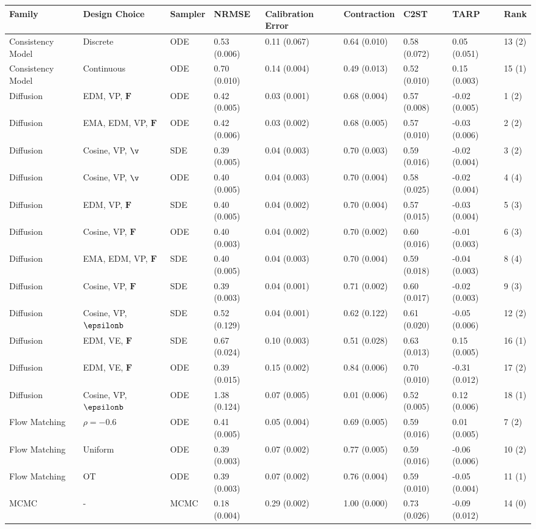 \begin{tabular}{lllllllll}
\toprule
Family & Design Choice & Sampler & NRMSE & Calibration Error & Contraction & C2ST & TARP & Rank \\
\midrule
Consistency Model & Discrete & ODE & 0.53 (0.006) & 0.11 (0.067) & 0.64 (0.010) & 0.58 (0.072) & 0.05 (0.051) & 13 (2) \\
Consistency Model & Continuous & ODE & 0.70 (0.010) & 0.14 (0.004) & 0.49 (0.013) & 0.52 (0.010) & 0.15 (0.003) & 15 (1) \\
Diffusion & EDM, VP, $\mathbf{F}$ & ODE & 0.42 (0.005) & 0.03 (0.001) & 0.68 (0.004) & 0.57 (0.008) & -0.02 (0.005) & 1 (2) \\
Diffusion & EMA, EDM, VP, $\mathbf{F}$ & ODE & 0.42 (0.006) & 0.03 (0.002) & 0.68 (0.005) & 0.57 (0.010) & -0.03 (0.006) & 2 (2) \\
Diffusion & Cosine, VP, $\v$ & SDE & 0.39 (0.005) & 0.04 (0.003) & 0.70 (0.003) & 0.59 (0.016) & -0.02 (0.004) & 3 (2) \\
Diffusion & Cosine, VP, $\v$ & ODE & 0.40 (0.005) & 0.04 (0.003) & 0.70 (0.004) & 0.58 (0.025) & -0.02 (0.004) & 4 (4) \\
Diffusion & EDM, VP, $\mathbf{F}$ & SDE & 0.40 (0.005) & 0.04 (0.002) & 0.70 (0.004) & 0.57 (0.015) & -0.03 (0.004) & 5 (3) \\
Diffusion & Cosine, VP, $\mathbf{F}$ & ODE & 0.40 (0.003) & 0.04 (0.002) & 0.70 (0.002) & 0.60 (0.016) & -0.01 (0.003) & 6 (3) \\
Diffusion & EMA, EDM, VP, $\mathbf{F}$ & SDE & 0.40 (0.005) & 0.04 (0.003) & 0.70 (0.004) & 0.59 (0.018) & -0.04 (0.003) & 8 (4) \\
Diffusion & Cosine, VP, $\mathbf{F}$ & SDE & 0.39 (0.003) & 0.04 (0.001) & 0.71 (0.002) & 0.60 (0.017) & -0.02 (0.003) & 9 (3) \\
Diffusion & Cosine, VP, $\epsilonb$ & SDE & 0.52 (0.129) & 0.04 (0.001) & 0.62 (0.122) & 0.61 (0.020) & -0.05 (0.006) & 12 (2) \\
Diffusion & EDM, VE, $\mathbf{F}$ & SDE & 0.67 (0.024) & 0.10 (0.003) & 0.51 (0.028) & 0.63 (0.013) & 0.15 (0.005) & 16 (1) \\
Diffusion & EDM, VE, $\mathbf{F}$ & ODE & 0.39 (0.015) & 0.15 (0.002) & 0.84 (0.006) & 0.70 (0.010) & -0.31 (0.012) & 17 (2) \\
Diffusion & Cosine, VP, $\epsilonb$ & ODE & 1.38 (0.124) & 0.07 (0.005) & 0.01 (0.006) & 0.52 (0.005) & 0.12 (0.006) & 18 (1) \\
Flow Matching & $\rho=-0.6$ & ODE & 0.41 (0.005) & 0.05 (0.004) & 0.69 (0.005) & 0.59 (0.016) & 0.01 (0.005) & 7 (2) \\
Flow Matching & Uniform & ODE & 0.39 (0.003) & 0.07 (0.002) & 0.77 (0.005) & 0.59 (0.016) & -0.06 (0.006) & 10 (2) \\
Flow Matching & OT & ODE & 0.39 (0.003) & 0.07 (0.002) & 0.76 (0.004) & 0.59 (0.010) & -0.05 (0.004) & 11 (1) \\
MCMC & - & MCMC & 0.18 (0.004) & 0.29 (0.002) & 1.00 (0.000) & 0.73 (0.026) & -0.09 (0.012) & 14 (0) \\
\bottomrule
\end{tabular}
